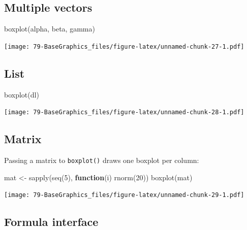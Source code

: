 \documentclass[
]{book}
\newenvironment{Shaded}{\begin{snugshade}}{\end{snugshade}}
\newcommand{\ControlFlowTok}[1]{\textcolor[rgb]{0.13,0.29,0.53}{\textbf{#1}}}
\newcommand{\DecValTok}[1]{\textcolor[rgb]{0.00,0.00,0.81}{#1}}
\newcommand{\FunctionTok}[1]{\textcolor[rgb]{0.00,0.00,0.00}{#1}}
\newcommand{\NormalTok}[1]{#1}
\newcommand{\OtherTok}[1]{\textcolor[rgb]{0.56,0.35,0.01}{#1}}
\begin{document}
\hypertarget{multiple-vectors}{%
\subsection{Multiple vectors}\label{multiple-vectors}}

\begin{Shaded}
\begin{Highlighting}[]
\FunctionTok{boxplot}\NormalTok{(alpha, beta, gamma)}
\end{Highlighting}
\end{Shaded}

\texttt{[image: 79-BaseGraphics\_files/figure-latex/unnamed-chunk-27-1.pdf]}

\hypertarget{list}{%
\subsection{List}\label{list}}

\begin{Shaded}
\begin{Highlighting}[]
\FunctionTok{boxplot}\NormalTok{(dl)}
\end{Highlighting}
\end{Shaded}

\texttt{[image: 79-BaseGraphics\_files/figure-latex/unnamed-chunk-28-1.pdf]}

\hypertarget{matrix-1}{%
\subsection{Matrix}\label{matrix-1}}

Passing a matrix to \texttt{boxplot()} draws one boxplot per column:

\begin{Shaded}
\begin{Highlighting}[]
\NormalTok{mat }\OtherTok{\textless{}{-}} \FunctionTok{sapply}\NormalTok{(}\FunctionTok{seq}\NormalTok{(}\DecValTok{5}\NormalTok{), }\ControlFlowTok{function}\NormalTok{(i) }\FunctionTok{rnorm}\NormalTok{(}\DecValTok{20}\NormalTok{))}
\FunctionTok{boxplot}\NormalTok{(mat)}
\end{Highlighting}
\end{Shaded}

\texttt{[image: 79-BaseGraphics\_files/figure-latex/unnamed-chunk-29-1.pdf]}

\hypertarget{formula-interface-1}{%
\subsection{Formula interface}\label{formula-interface-1}}
\end{document}

